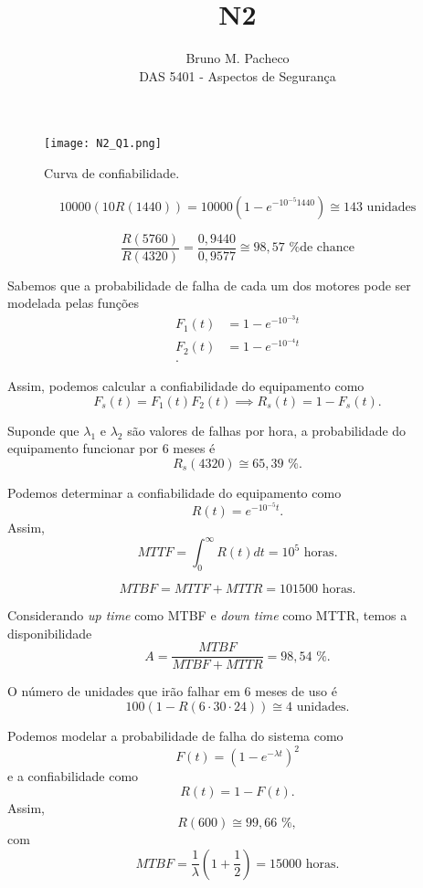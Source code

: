 \documentclass[a4paper]{report}
\begin{document}
 
\title{N2}
\author{Bruno M. Pacheco\\
DAS 5401 - Aspectos de Segurança}
 
\maketitle
 


\begin{figure}[H]
    \centering
    \texttt{[image: N2\_Q1.png]}
    \caption{Curva de confiabilidade.}
    \label{fig:}
\end{figure}


\[
    10000 \left( 10 R(1440)\right)  = 10000 \left( 1- e^{-10^{-5}1440}\right)  \cong 143 \text{ unidades}
\] 


\[
    \frac{R(5760)}{R(4320)} = \frac{0,9440}{0,9577} \cong 98,57 \text{ \% de chance}
\] 


Sabemos que a probabilidade de falha de cada um dos motores pode ser modelada pelas funções
\begin{align*}
    F_1(t) &= 1 - e^{-10^{-3}t} \\
    F_2(t) &= 1 - e^{-10^{-4}t} \\
.\end{align*}

Assim, podemos calcular a confiabilidade do equipamento como \[
    F_s(t) = F_1(t)F_2(t) \implies R_s(t) = 1-F_s(t)
.\] 

Suponde que $\lambda_1$ e $\lambda_2$ são valores de falhas por hora, a probabilidade do equipamento funcionar por 6 meses é \[
    R_s(4320) \cong 65,39 \text{ \%}
.\] 


Podemos determinar a confiabilidade do equipamento como \[
    R(t) = e^{-10^{-5}t}
.\] Assim, \[
MTTF = \int_0^{\infty}R(t)dt = 10^5 \text{ horas}
.\] 

\[
MTBF = MTTF + MTTR = 101500 \text{ horas}
.\]  

Considerando \emph{up time} como MTBF e \emph{down time} como MTTR, temos a disponibilidade \[
A = \frac{MTBF}{MTBF + MTTR} = 98,54 \text{ \%}
.\] 

O número de unidades que irão falhar em 6 meses de uso é \[
    100 \left( 1 - R(6\cdot 30\cdot 24) \right) \cong 4 \text{ unidades.} 
\] 


Podemos modelar a probabilidade de falha do sistema como \[
    F(t) = (1 - e^{-\lambda t})^2
\] e a confiabilidade como \[
R(t) = 1- F(t)
.\] Assim, \[
R(600) \cong 99,66 \text{ \%}
,\] com \[
MTBF = \frac{1}{\lambda}\left( 1 + \frac{1}{2} \right) = 15000 \text{ horas}
.\] 
\end{document}
